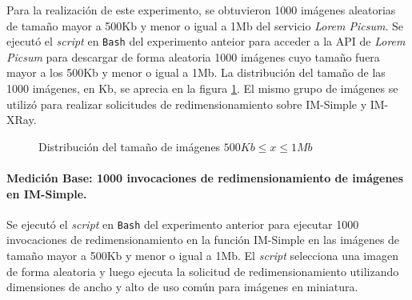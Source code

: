 Para la realización de este experimento, se obtuvieron 1000 imágenes aleatorias de tamaño mayor a 500Kb y menor o igual a 1Mb del servicio \emph{Lorem Picsum}. Se ejecutó el \emph{script} en \texttt{Bash} del experimento anteior para acceder a la API de \emph{Lorem Picsum} para descargar de forma aleatoria 1000 imágenes cuyo tamaño fuera mayor a los 500Kb y menor o igual a 1Mb. La distribución del tamaño de las 1000 imágenes, en Kb, se aprecia en la figura \ref{fig:distribucion-tamanno-imagenes-hasta-1mb}. El mismo grupo de imágenes se utilizó para realizar solicitudes de redimensionamiento sobre IM-Simple y IM-XRay.

\begin{figure}[h]
\hspace{-2.0cm}
\caption{Distribución del tamaño de imágenes $500Kb \leq x \leq 1Mb$}
\label{fig:distribucion-tamanno-imagenes-hasta-1mb}
\end{figure}

\paragraph{Medición Base: 1000 invocaciones de redimensionamiento de imágenes en IM-Simple.} 
Se ejecutó el \emph{script} en \texttt{Bash} del experimento anterior para ejecutar 1000 invocaciones de redimensionamiento en la función IM-Simple en las imágenes de tamaño mayor a 500Kb y menor o igual a 1Mb. El \emph{script} selecciona una imagen de forma aleatoria y luego ejecuta la solicitud de redimensionamiento utilizando dimensiones de ancho y alto de uso común para imágenes en miniatura.

